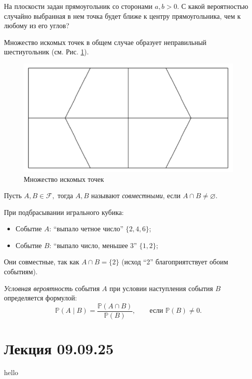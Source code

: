 \documentclass[12pt,a4paper]{article}
\begin{document}
\begin{example}
    На плоскости задан прямоугольник со сторонами $a, b > 0$. С какой вероятностью случайно выбранная в нем точка будет ближе к центру прямоугольника, чем к любому из его углов?
\end{example}
\begin{solution}
    Множество искомых точек в общем случае образует неправильный шестиугольник (см. Рис. \ref{fig:ex1}).
\end{solution}

\begin{figure}[h]
    \centering
    \includegraphics[scale=0.3]{images/ex1.png}
    \caption{Множество искомых точек}
    \label{fig:ex1}
\end{figure}

\begin{definition}
    Пусть $A, B \in \mathcal{F},$ тогда $A, B$ называют \textit{совместными}, если $A \cap B \neq \varnothing$.
\end{definition}

\begin{example}
При подбрасывании игрального кубика:
\begin{itemize}
    \item Событие $A$: ``выпало четное число'' $\{2, 4, 6\}$;
    \item Событие $B$: ``выпало число, меньшее 3'' $\{1, 2\}$;
\end{itemize}
Они совместные, так как $A \cap B = \{2\}$ (исход ``2'' благоприятствует обоим событиям).
\end{example}

\begin{definition}
    \textit{Условная вероятность} события $A$ при условии наступления события $B$ определяется формулой: $$\mathbb{P}\left( A \mid B \right) = \frac{\mathbb{P}\left( A \cap B \right)}{\mathbb{P}\left( B \right)}, \qquad \text{если } \mathbb{P}\left(B\right) \neq 0.$$
\end{definition}

\section{Лекция 09.09.25}

hello
\end{document}

